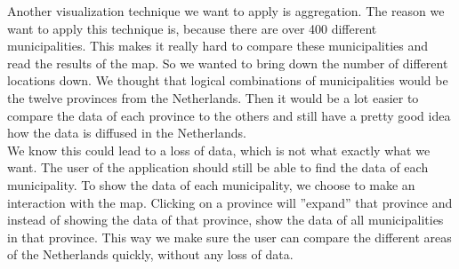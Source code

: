 Another visualization technique we want to apply is aggregation. The reason we want to apply this technique is, because there are over 400 different municipalities. This makes it really hard to compare these municipalities and read the results of the map. So we wanted to bring down the number of different locations down. We thought that logical combinations of municipalities would be the twelve provinces from the Netherlands. Then it would be a lot easier to compare the data of each province to the others and still have a pretty good idea how the data is diffused in the Netherlands. \\
We know this could lead to a loss of data, which is not what exactly what we want. The user of the application should still be able to find the data of each municipality. To show the data of each municipality, we choose to make an interaction with the map. Clicking on a province will ''expand'' that province and instead of showing the data of that province, show the data of all municipalities in that province. This way we make sure the user can compare the different areas of the Netherlands quickly, without any loss of data. \\
